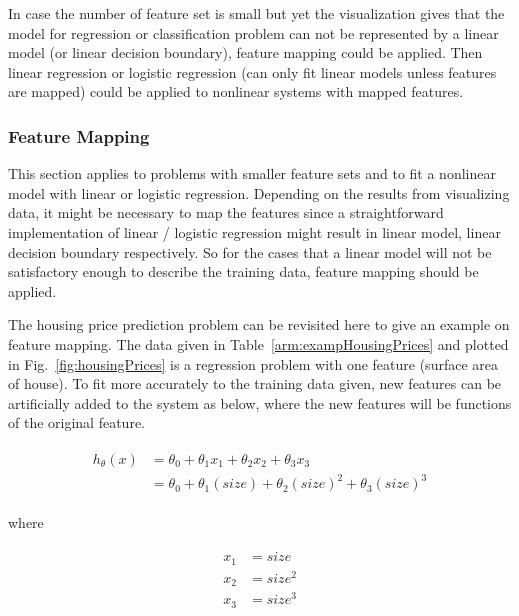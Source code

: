 In case the number of feature set is small but yet the visualization gives that the model for regression or classification problem can not be represented by a linear model (or linear decision boundary), feature mapping could be applied. 
Then linear regression or logistic regression (can only fit linear models unless features are mapped) could be applied to nonlinear systems with mapped features.  

\subsubsection{Feature Mapping}

This section applies to problems with smaller feature sets and to fit a nonlinear model with linear or logistic regression.
Depending on the results from visualizing data, it might be necessary to map the features since a straightforward implementation of linear / logistic regression might result in linear model, linear decision boundary respectively. 
So for the cases that a linear model will not be satisfactory enough to describe the training data, feature mapping should be applied.

The housing price prediction problem can be revisited here to give an example on feature mapping.
The data given in Table~\ref{arm:exampHousingPrices} and plotted in Fig.~\ref{fig:housingPrices} is a regression problem with one feature (surface area of house).
To fit more accurately to the training data given, new features can be artificially added to the system as below, where the new features will be functions of the original feature.

\begin{align}
\label{eqn:costFuncExamp1}
\begin{split}
h_{\theta}(x) & = \theta_0 + \theta_1 x_1 + \theta_2 x_2 + \theta_3 x_3
\\
& = \theta_0 + \theta_1 (size) + \theta_2 {(size)}^2 + \theta_3 {(size)}^3
\end{split}
\end{align}

where

\begin{align}
\label{eqn:featureMapping1}
\begin{split}
x_1 & = size
\\
x_2 & = size^2
\\
x_3 & = size^3
\end{split}
\end{align}

